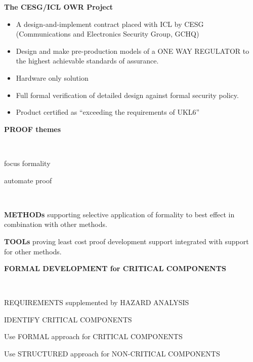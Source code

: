 \begin{slide}{}
\begin{center}
{\bf The CESG/ICL OWR Project}

\begin{itemize}
\item
A design-and-implement contract placed with ICL by CESG (Communications and Electronics Security Group, GCHQ)
\item
Design and make pre-production models of a ONE WAY REGULATOR to the highest achievable standards of assurance.
\item
Hardware only solution
\item
Full formal verification of detailed design against formal security policy.
\item
Product certified as ``exceeding the requirements of UKL6''
\end{itemize}
\end{center}
\end{slide}

\begin{slide}{}

\begin{center}

{\bf { PROOF}
themes

\ 

focus formality


automate proof}

\ 

\end{center}


{\bf { METHODs}} supporting selective application of formality to best effect in combination with other methods.



{\bf { TOOLs}} proving least cost proof development support integrated with support for other methods.

\end{slide}


\begin{slide}{}
\begin{center}
{\bf FORMAL DEVELOPMENT
for CRITICAL COMPONENTS}

\ 

REQUIREMENTS
supplemented by
HAZARD ANALYSIS

IDENTIFY CRITICAL COMPONENTS

Use FORMAL approach
for CRITICAL COMPONENTS

Use STRUCTURED approach
for NON-CRITICAL COMPONENTS

\end{center}
\end{slide}


